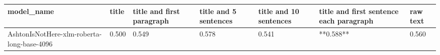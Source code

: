 \begin{tabular}{lllllll}
\toprule
                                model\_name & title & title and first paragraph & title and 5 sentences & title and 10 sentences & title and first sentence each paragraph & raw text \\
\midrule
AshtonIsNotHere-xlm-roberta-long-base-4096 & 0.500 &                     0.549 &                 0.578 &                  0.541 &                               **0.588** &    0.560 \\
\bottomrule
\end{tabular}
